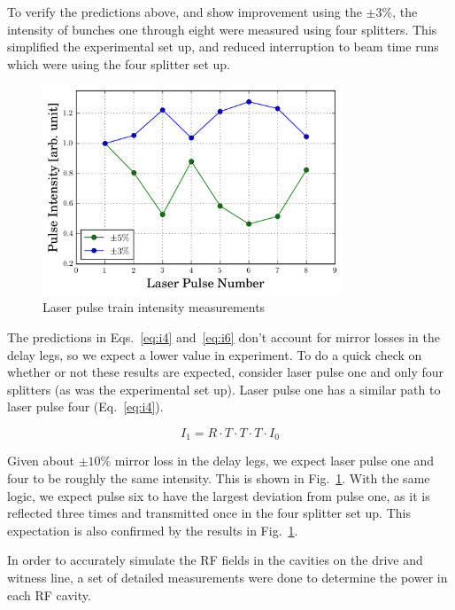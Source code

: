\documentclass{iitthesis}
\begin{document}
To verify the predictions above, and show improvement using the $\pm3\%$,
the intensity of bunches one through eight were measured using four splitters. 
This simplified the experimental set up, and reduced interruption to beam time 
runs which were using the four splitter
set up.  
\begin{figure}[h]
	\begin{center}
		\includegraphics[width=0.8\textwidth]{images/splitter_improvement}\caption{Laser pulse train intensity measurements}
	\end{center}
	\label{fig:origtrain}
\end{figure}
The predictions in Eqs.~\ref{eq:i4} and~\ref{eq:i6} don't account for mirror losses in the delay legs, 
so we expect a lower value in experiment. To do a quick check on whether or not these results are 
expected, consider laser pulse one and only four splitters (as was the experimental set up). 
Laser pulse one has a similar path to laser pulse four (Eq.~\ref{eq:i4}). 

\begin{equation}
I_1 = R \cdot T \cdot T \cdot T \cdot I_0 
\end{equation}

Given about $\pm10\%$ mirror loss in the delay legs, we expect laser pulse one and four 
to be roughly the same intensity. This is shown in Fig.~\ref{fig:origtrain}. With the same 
logic, we expect pulse six to have the largest deviation from pulse one, as it is reflected 
three times and transmitted once in the four splitter set up. This expectation is also 
confirmed by the results in Fig.~\ref{fig:origtrain}.

In order to accurately simulate the RF fields in the cavities on the drive and witness line, 
a set of detailed measurements were done to determine the power in each RF cavity.
\end{document}
